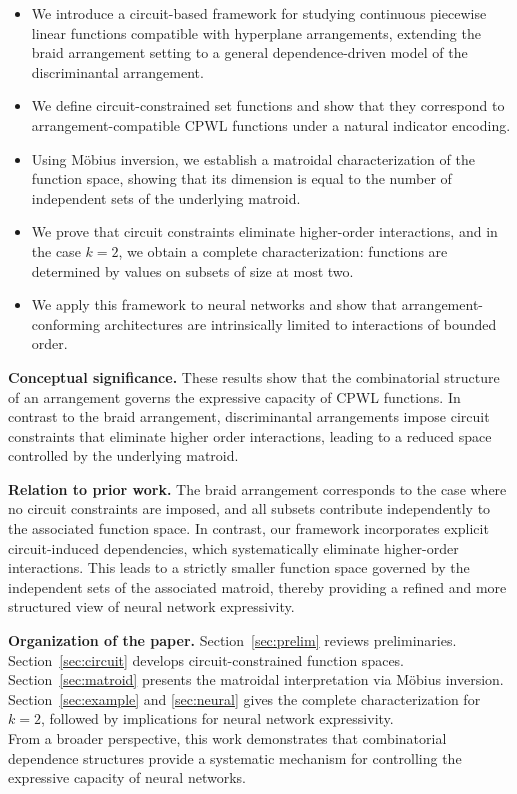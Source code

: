 \documentclass{amsart}
\theoremstyle{definition}
\begin{document}
\begin{itemize}
\item We introduce a circuit-based framework for studying continuous piecewise linear functions compatible with hyperplane arrangements, extending the braid arrangement setting to a general dependence-driven model of the discriminantal arrangement.

\item We define circuit-constrained set functions and show that they correspond to arrangement-compatible CPWL functions under a natural indicator encoding.

\item Using Möbius inversion, we establish a matroidal characterization of the function space, showing that its dimension is equal to the number of independent sets of the underlying matroid.

\item We prove that circuit constraints eliminate higher-order interactions, and in the case $k=2$, we obtain a complete characterization: functions are determined by values on subsets of size at most two.

\item We apply this framework to neural networks and show that arrangement-conforming architectures are intrinsically limited to interactions of bounded order.
\end{itemize}
\noindent
\textbf{Conceptual significance.}
These results show that the combinatorial structure of an arrangement governs the expressive capacity of CPWL functions. In contrast to the braid arrangement, discriminantal arrangements impose circuit constraints that eliminate higher order interactions, leading to a reduced space controlled by the underlying matroid.

\medskip

\noindent
\textbf{Relation to prior work.}
The braid arrangement corresponds to the case where no circuit constraints are imposed, and all subsets contribute independently to the associated function space. In contrast, our framework incorporates explicit circuit-induced dependencies, which systematically eliminate higher-order interactions. This leads to a strictly smaller function space governed by the independent sets of the associated matroid, thereby providing a refined and more structured view of neural network expressivity.

\medskip

\noindent
\textbf{Organization of the paper.}
Section~\ref{sec:prelim} reviews preliminaries. Section~\ref{sec:circuit} develops circuit-constrained function spaces. Section~\ref{sec:matroid} presents the matroidal interpretation via Möbius inversion. Section~\ref{sec:example} and \ref{sec:neural} gives the complete characterization for $k=2$, followed by implications for neural network expressivity.\\
\noindent
From a broader perspective, this work demonstrates that combinatorial dependence structures provide a systematic mechanism for controlling the expressive capacity of neural networks.
\end{document}
